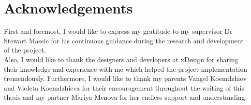 \chapter{Acknowledgements}
First and foremost, I would like to express my gratitude to my supervisor Dr Stewart Massie for his continuous guidance during the research and development of the project. \\

\noindent Also, I would like to thank the designers and developers at xDesign for sharing their knowledge and experience with me which helped the project implementation tremendously. Furthermore, I would like to thank my parents Vangel Koemdzhiev and Violeta Koemdzhieva for their encouragement throughout the writing of this thesis and my partner Mariya Menova for her endless support and understanding.
